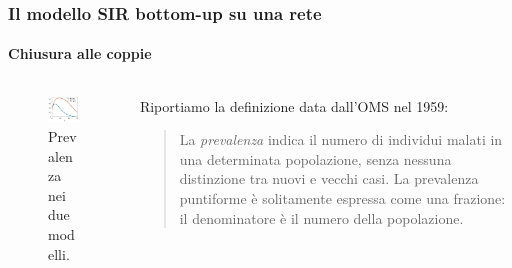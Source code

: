 \documentclass{beamer}
\theoremstyle{definition}
\theoremstyle{plain}
\begin{document}
\begin{frame}
\frametitle{Il modello SIR bottom-up su una rete}
\framesubtitle{Chiusura alle coppie}
\begin{columns}
\begin{column}{0.5\textwidth}
\begin{figure}
    \centering
    \includegraphics[scale=0.8]{Figure/Coppie_Prevalenza}
    \caption{Prevalenza nei  due modelli. }
\end{figure}
    \end{column}
    \begin{column}{0.5\textwidth}
    Riportiamo la definizione data dall'OMS nel 1959:
    \begin{quote}La \textit{prevalenza} indica il numero di individui malati in una determinata popolazione, senza nessuna distinzione tra nuovi e vecchi casi. La \alert{prevalenza puntiforme}  \`e solitamente espressa come una frazione: il denominatore \`e il numero della
    popolazione.	
    \end{quote}
    \end{column}
\end{columns}
\end{frame}
\end{document}

